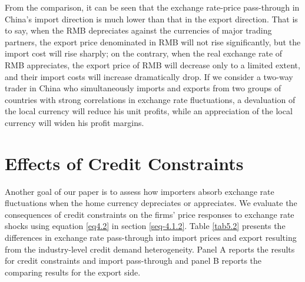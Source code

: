 From the comparison, it can be seen that the exchange rate-price pass-through in China's import direction is much lower than that in the export direction. That is to say, when the RMB depreciates against the currencies of major trading partners, the export price denominated in RMB will not rise significantly, but the import cost will rise sharply; on the contrary, when the real exchange rate of RMB appreciates, the export price of RMB will decrease only to a limited extent, and their import costs will increase dramatically drop. If we consider a two-way trader in China who simultaneously imports and exports from two groups of countries with strong correlations in exchange rate fluctuations, a devaluation of the local currency will reduce his unit profits, while an appreciation of the local currency will widen his profit margins.

\section{Effects of Credit Constraints}\label{sec-5.2}

Another goal of our paper is to assess how importers absorb exchange rate fluctuations when the home currency depreciates or appreciates. We evaluate the consequences of credit constraints on the firms' price responses to exchange rate shocks using equation \ref{eq4.2} in section \ref{seq-4.1.2}. Table \ref{tab5.2} presents the differences in exchange rate pass-through into import prices and export resulting from the industry-level credit demand heterogeneity. Panel A reports the results for credit constraints and import pass-through and panel B reports the comparing results for the export side. 

